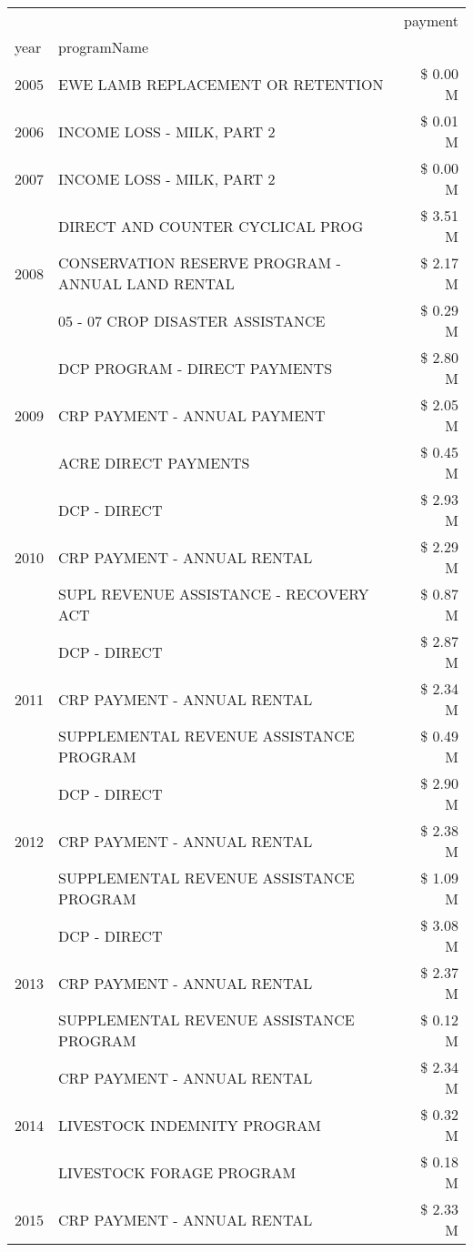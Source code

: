 \begin{tabular}{llr}
\toprule
 &  & payment \\
year & programName &  \\
\midrule
2005 & EWE LAMB REPLACEMENT OR RETENTION & \$ 0.00 M \\
\cline{1-3}
2006 & INCOME LOSS - MILK, PART 2 & \$ 0.01 M \\
\cline{1-3}
2007 & INCOME LOSS - MILK, PART 2 & \$ 0.00 M \\
\cline{1-3}
\multirow[t]{3}{*}{2008} & DIRECT AND COUNTER CYCLICAL PROG & \$ 3.51 M \\
 & CONSERVATION RESERVE PROGRAM - ANNUAL LAND RENTAL & \$ 2.17 M \\
 & 05 - 07 CROP DISASTER ASSISTANCE & \$ 0.29 M \\
\cline{1-3}
\multirow[t]{3}{*}{2009} & DCP PROGRAM - DIRECT PAYMENTS & \$ 2.80 M \\
 & CRP PAYMENT - ANNUAL PAYMENT & \$ 2.05 M \\
 & ACRE DIRECT PAYMENTS & \$ 0.45 M \\
\cline{1-3}
\multirow[t]{3}{*}{2010} & DCP - DIRECT & \$ 2.93 M \\
 & CRP PAYMENT - ANNUAL RENTAL & \$ 2.29 M \\
 & SUPL REVENUE ASSISTANCE - RECOVERY ACT & \$ 0.87 M \\
\cline{1-3}
\multirow[t]{3}{*}{2011} & DCP - DIRECT & \$ 2.87 M \\
 & CRP PAYMENT - ANNUAL RENTAL & \$ 2.34 M \\
 & SUPPLEMENTAL REVENUE ASSISTANCE PROGRAM & \$ 0.49 M \\
\cline{1-3}
\multirow[t]{3}{*}{2012} & DCP - DIRECT & \$ 2.90 M \\
 & CRP PAYMENT - ANNUAL RENTAL & \$ 2.38 M \\
 & SUPPLEMENTAL REVENUE ASSISTANCE PROGRAM & \$ 1.09 M \\
\cline{1-3}
\multirow[t]{3}{*}{2013} & DCP - DIRECT & \$ 3.08 M \\
 & CRP PAYMENT - ANNUAL RENTAL & \$ 2.37 M \\
 & SUPPLEMENTAL REVENUE ASSISTANCE PROGRAM & \$ 0.12 M \\
\cline{1-3}
\multirow[t]{3}{*}{2014} & CRP PAYMENT - ANNUAL RENTAL & \$ 2.34 M \\
 & LIVESTOCK INDEMNITY PROGRAM & \$ 0.32 M \\
 & LIVESTOCK FORAGE PROGRAM & \$ 0.18 M \\
\cline{1-3}
\multirow[t]{3}{*}{2015} & CRP PAYMENT - ANNUAL RENTAL & \$ 2.33 M \\

\end{tabular}
